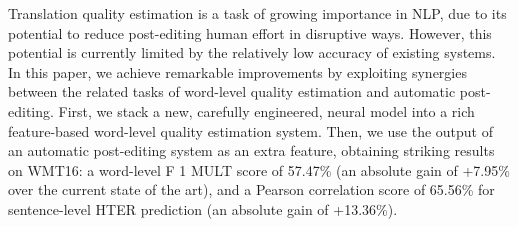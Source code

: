 Translation quality estimation is a task of growing importance in NLP, due to its potential to reduce post-editing human effort in disruptive ways. However, this potential is currently limited by the relatively low accuracy of existing systems. In this paper, we achieve remarkable improvements by exploiting synergies between the related tasks of word-level quality estimation and automatic post-editing. First, we stack a new, carefully engineered, neural model into a rich feature-based word-level quality estimation system. Then, we use the output of an automatic post-editing system as an extra feature, obtaining striking results on WMT16{:} a word-level F 1 MULT score of 57.47\% (an absolute gain of +7.95\% over the current state of the art), and a Pearson correlation score of 65.56\% for sentence-level HTER prediction (an absolute gain of +13.36\%).